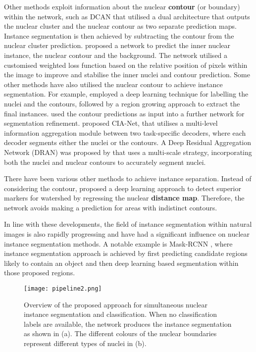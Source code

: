 \documentclass[journal]{IEEEtran}
\begin{document}
	Other methods exploit information about the nuclear \textbf{contour} (or boundary) within the network, such as DCAN \cite{chen2016dcan} that utilised a dual architecture that outputs the nuclear cluster and the nuclear contour as two separate prediction maps. Instance segmentation is then achieved by subtracting the contour from the nuclear cluster prediction. \cite{cui2018deep} proposed a network to predict the inner nuclear instance, the nuclear contour and the background. The network utilised a customised weighted loss function based on the relative position of pixels within the image to improve and stabilise the inner nuclei and contour prediction. Some other methods have also utilised the nuclear contour to achieve instance segmentation. For example, \cite{kumar} employed a deep learning technique for labelling the nuclei and the contours, followed by a region growing approach to extract the final instances. \cite{khoshdeli2018deep} used the contour predictions as input into a further network for segmentation refinement. \cite{zhou2019cia} proposed CIA-Net, that utilises a multi-level information aggregation module between two task-specific decoders, where each decoder segments either the nuclei or the contours. A Deep Residual Aggregation Network (DRAN) was proposed by \cite{vu2018methods} that uses a multi-scale strategy, incorporating both the nuclei and nuclear contours to accurately segment nuclei.
	
	There have been various other methods to achieve instance separation. Instead of considering the contour, \cite{naylor2018segmentation} proposed a deep learning approach to detect superior markers for watershed by regressing the nuclear \textbf{distance map}. Therefore, the network avoids making a prediction for areas with indistinct contours.
	
	In line with these developments, the field of instance segmentation within natural images is also rapidly progressing and have had a significant influence on nuclear instance segmentation methods. A notable example is Mask-RCNN \cite{mrcnn}, where instance segmentation approach is achieved by first predicting candidate regions likely to contain an object and then deep learning based segmentation within those proposed regions.
	
		\begin{figure*}[t!]
		\centering
		\texttt{[image: pipeline2.png]}
		\caption{Overview of the proposed approach for simultaneous nuclear instance segmentation and classification. When no classification labels are available, the network produces the instance segmentation as shown in (a). The different colours of the nuclear boundaries represent different types of nuclei in (b).}
		\label{fig:pipeline}
	\end{figure*}
	
\end{document}
